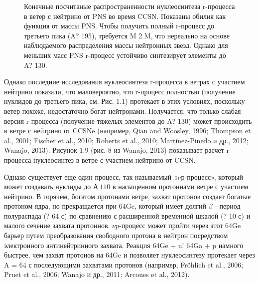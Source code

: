 \documentclass[%
bachelor,    %
natbib,      %
subf,        %
href,        %
colorlinks,  %
]{disser}
\begin{document}
\begin{figure}[h]
	\caption{Конечные посчитаные распространенности нуклеосинтеза r-процесса в ветер с нейтрино от PNS во время CCSN. Показаны обилия как функция от массы PNS. Чтобы получить полный r-процесс до третьего пика (A? 195), требуется M  2 M, что нереально на основе наблюдаемого распределения массы нейтронных звезд. Однако для меньших масс PNS r-процесс устойчиво синтезирует элементы до A? 130.}
	\label{ris:9}
\end{figure} 

Однако последние исследования нуклеосинтеза r-процесса в ветрах с участием нейтрино показали, что маловероятно, что r-процесс полностью (получение нуклидов до третьего пика, см. Рис. 1.1) протекает в этих условиях, поскольку ветер похоже, недостаточно богат нейтронами. Получается, что только слабая версия r-процесса (получение тяжелых элементов до A? 130) может происходить в ветре с нейтрино от CCSNe (например, Qian and Woosley, 1996; Thompson et al., 2001; Fischer et al., 2010; Roberts et al., 2010; Martínez-Pinedo и др., 2012; Wanajo, 2013). Рисунок 1.9 (рис. 8 из Wanajo, 2013) показывает расчет r-процесса нуклеосинтез в ветре с участием нейтрино от CCSN.

Однако существует еще один процесс, так называемый «$\nu р$-процесс», который может создавать нуклиды до $А~110$ в насыщенном протоннами ветре с участием нейтрино. В горячем, богатом протонами ветре, захват протонов создает богатые протоном ядра, но прекращается при 64Ge, который имеет долгий $\beta$ - период полураспада (? 64 с) по сравнению с расширенной временной шкалой (? 10 с) и малого сечение захвата протоннов. $\nu p$-процесс может пройти через этот 64Ge барьер путем преобразования свободного протона в нейтрон посредством электронного антинейтринного захвата. Реакция 64Ge + n! 64Ga + p намного быстрее, чем захват протонов на 64Ge и позволяет нуклеосинтезу протекает через A = 64 с последующими захватами протонов (например, Fröhlich et al., 2006; Pruet et al., 2006; Wanajo и др., 2011; Arcones et al., 2012).
\end{document}
